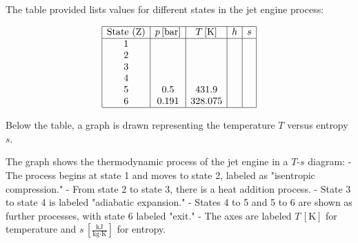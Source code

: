 The table provided lists values for different states in the jet engine process:  

\[
\begin{array}{|c|c|c|c|c|}
\hline
\text{State (Z)} & p \, [\text{bar}] & T \, [\text{K}] & h & s \\
\hline
1 & & & & \\
2 & & & & \\
3 & & & & \\
4 & & & & \\
5 & 0.5 & 431.9 & & \\
6 & 0.191 & 328.075 & & \\
\hline
\end{array}
\]

Below the table, a graph is drawn representing the temperature \( T \) versus entropy \( s \).  

The graph shows the thermodynamic process of the jet engine in a \( T \)-\( s \) diagram:  
- The process begins at state 1 and moves to state 2, labeled as "isentropic compression."  
- From state 2 to state 3, there is a heat addition process.  
- State 3 to state 4 is labeled "adiabatic expansion."  
- States 4 to 5 and 5 to 6 are shown as further processes, with state 6 labeled "exit."  
- The axes are labeled \( T \, [\text{K}] \) for temperature and \( s \, [\frac{\text{kJ}}{\text{kg·K}}] \) for entropy.